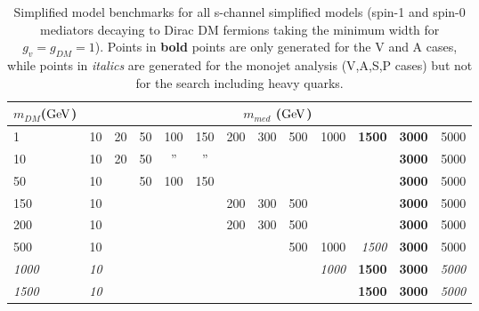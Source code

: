 \documentclass[debug,notitlepage]{dmfm}
\newcommand{\ditto}[1][.4pt]{\xrfill{#1}~''~\xrfill{#1}}
\newcommand{\mdm}{\ensuremath{m_{DM}}\xspace}
\begin{document}
\begin{table}[!h]
\centering
\begin{tabular}{| l |r r r r r r r r r r r r|}
\hline
\multicolumn{1}{|c|}{\mdm (${\rm GeV}$)} & \multicolumn{12}{c|}{$m_{med}$ (${\rm GeV}$)} \\
\hline
 1    & 10 & 20 & 50 & 100 & 150 & 200 & 300 & 500 & 1000 & \textbf{1500} & \textbf{3000} & 5000  \\
 10   & 10 & 20 & 50 & \ditto    & \ditto    &     &     &     &      &               & \textbf{3000} & 5000  \\
 50   & 10 &    & 50 & 100 & 150 &     &     &     &      &               & \textbf{3000} & 5000  \\
 150  & 10 &    &    &     &     & 200 & 300 & 500 &      &               & \textbf{3000} & 5000  \\
 200  & 10 &    &    &     &     & 200 & 300 & 500  &     &               & \textbf{3000} & 5000  \\
 500  & 10 &    &    &     &     &     &     & 500 & 1000 & \textit{1500} & \textbf{3000} & 5000  \\
 \textit{1000} & \textit{10} &    &    &     &     &     &     & & \textit{1000} & \textbf{1500} & \textbf{3000} & \textit{5000}  \\
 \textit{1500} & \textit{10} &    &    &     &     &     &     &              & & \textbf{1500} & \textbf{3000} & \textit{5000}  \\
\hline
\end{tabular}
\caption{Simplified model benchmarks for all s-channel simplified models (spin-1 and spin-0 mediators 
decaying to Dirac DM fermions taking the minimum width for $g_v = g_{DM} = 1$).
Points in \textbf{bold} points are only generated for the V and A cases, while points in 
\textit{italics} are generated for the monojet analysis (V,A,S,P cases) 
but not for the search including heavy quarks. }
\label{tab:ttdm_benchmarks}
\end{table}
\end{document}
